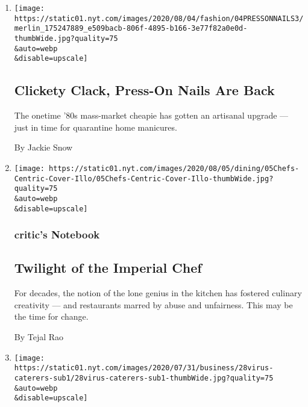 \begin{enumerate}
\def\labelenumi{\arabic{enumi}.}
\item
  \href{/2020/08/04/style/self-care/press-on-nails.html}{}

  \texttt{[image: https://static01.nyt.com/images/2020/08/04/fashion/04PRESSONNAILS3/merlin\_175247889\_e509bacb-806f-4895-b166-3e77f82a0e0d-thumbWide.jpg?quality=75\\\&auto=webp\\\&disable=upscale]}

  \hypertarget{clickety-clack-press-on-nails-are-back}{%
  \subsection{Clickety Clack, Press-On Nails Are
  Back}\label{clickety-clack-press-on-nails-are-back}}

  The onetime '80s mass-market cheapie has gotten an artisanal upgrade
  --- just in time for quarantine home manicures.

  By Jackie Snow
\item
  \href{/2020/08/04/dining/chef-restaurant-culture.html}{}

  \texttt{[image: https://static01.nyt.com/images/2020/08/05/dining/05Chefs-Centric-Cover-Illo/05Chefs-Centric-Cover-Illo-thumbWide.jpg?quality=75\\\&auto=webp\\\&disable=upscale]}

  \hypertarget{critics-notebook}{%
  \subsubsection{critic's Notebook}\label{critics-notebook}}

  \hypertarget{twilight-of-the-imperial-chef}{%
  \subsection{Twilight of the Imperial
  Chef}\label{twilight-of-the-imperial-chef}}

  For decades, the notion of the lone genius in the kitchen has fostered
  culinary creativity --- and restaurants marred by abuse and
  unfairness. This may be the time for change.

  By Tejal Rao
\item
  \href{/2020/08/04/business/coronavirus-struggling-caterers.html}{}

  \texttt{[image: https://static01.nyt.com/images/2020/07/31/business/28virus-caterers-sub1/28virus-caterers-sub1-thumbWide.jpg?quality=75\\\&auto=webp\\\&disable=upscale]}


\end{enumerate}
